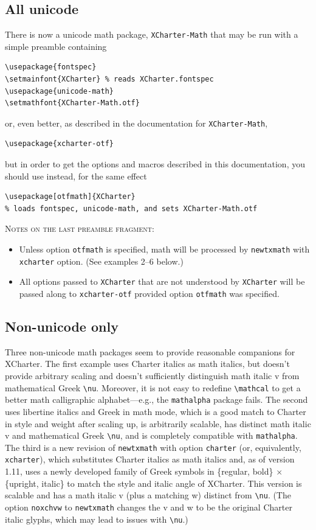 \documentclass[11pt]{article}
\begin{document}
\subsection*{All unicode}
There is now a unicode math package, {\tt XCharter-Math} that may be run with a simple preamble containing
\begin{verbatim}
\usepackage{fontspec}
\setmainfont{XCharter} % reads XCharter.fontspec
\usepackage{unicode-math}
\setmathfont{XCharter-Math.otf}
\end{verbatim}
or, even better, as described in the documentation for {\tt XCharter-Math},
\begin{verbatim}
\usepackage{xcharter-otf}
\end{verbatim}
but in order to get the options and macros described in this documentation, you should use instead, for the same effect
\begin{verbatim}
\usepackage[otfmath]{XCharter} 
% loads fontspec, unicode-math, and sets XCharter-Math.otf
\end{verbatim}
\textsc{Notes on the last preamble fragment:}
\begin{itemize}
\item
Unless option {\tt otfmath} is specified,  math will be processed by {\tt newtxmath} with {\tt xcharter} option. (See examples 2--6 below.)
\item All options passed to {\tt XCharter} that are not understood by {\tt XCharter} will be passed along to {\tt xcharter-otf} provided option {\tt otfmath} was specified. 
\end{itemize}
\subsection*{Non-unicode only} Three non-unicode math packages seem to provide reasonable companions for \textsf{XCharter}. The first example uses Charter italics as math italics, but doesn't provide arbitrary scaling and doesn't sufficiently distinguish math italic v from mathematical Greek \verb|\nu|. Moreover, it is not easy to redefine \verb|\mathcal| to get a better math calligraphic alphabet---e.g., the {\tt mathalpha} package fails. The second uses \textsf{libertine} italics and Greek in math mode, which is a good match to Charter in style and weight after scaling up, is arbitrarily scalable, has distinct math italic v and mathematical Greek \verb|\nu|, and is completely compatible with {\tt mathalpha}. The third is a new revision of {\tt newtxmath} with option {\tt charter} (or, equivalently, {\tt xcharter}), which substitutes Charter italics as math italics and, as of version 1.11,  uses a newly developed family of Greek symbols in \{regular, bold\} $\times$ \{upright, italic\} to match the style and italic angle of XCharter. This version is scalable and has a math italic v (plus a matching w) distinct from \verb|\nu|. (The option {\tt noxchvw} to {\tt newtxmath} changes the v and w to be the original Charter italic glyphs, which may lead to issues with \verb|\nu|.)
\end{document}
